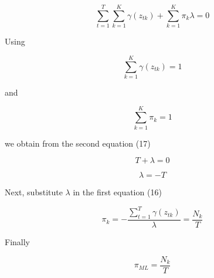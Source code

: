 \documentclass{article}
\begin{document}
\begin{equation}
\sum_{t=1}^T \sum_{k=1}^K \gamma(z_{tk}) + \sum_{k=1}^K \pi_k \lambda = 0
\end{equation}

Using 

\begin{equation}
\sum_{k=1}^K \gamma(z_{tk}) = 1
\end{equation}

and

\begin{equation}
\sum_{k=1}^K \pi_k = 1
\end{equation}

we obtain from the second equation (17)

\begin{equation}
T + \lambda = 0
\end{equation}

\begin{equation}
\lambda = -T
\end{equation}

Next, substitute $\lambda$ in the first equation (16)

\begin{equation}
\pi_k = - \frac{\sum_{t=1}^T\gamma(z_{tk})}{\lambda} = \frac{N_k}{T}
\end{equation}

Finally

\begin{equation}
\pi_{ML} = \frac{N_k}{T}
\end{equation}
\end{document}
